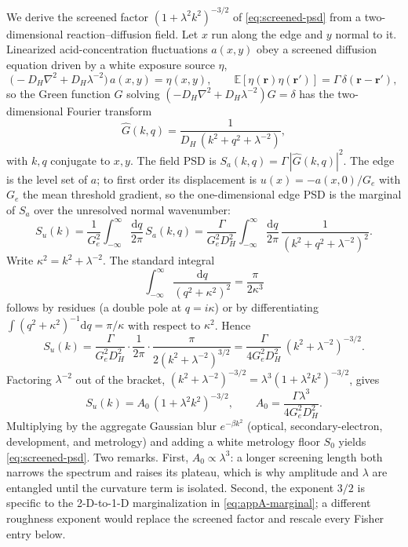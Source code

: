 \documentclass[11pt]{article}
\newcommand{\E}{\mathbb{E}}
\newcommand{\dd}{\mathrm{d}}
\begin{document}
We derive the screened factor \((1+\lambda^2k^2)^{-3/2}\) of \eqref{eq:screened-psd} from a two-dimensional reaction--diffusion field. Let \(x\) run along the edge and \(y\) normal to it. Linearized acid-concentration fluctuations \(a(x,y)\) obey a screened diffusion equation driven by a white exposure source \(\eta\),
\begin{equation}
\big(-D_H\nabla^2+D_H\lambda^{-2}\big)\,a(x,y)=\eta(x,y),
\qquad \E[\eta(\mathbf r)\eta(\mathbf r')]=\Gamma\,\delta(\mathbf r-\mathbf r'),
\label{eq:appA-pde}
\end{equation}
so the Green function \(G\) solving \((-D_H\nabla^2+D_H\lambda^{-2})G=\delta\) has the two-dimensional Fourier transform
\begin{equation}
\widehat G(k,q)=\frac{1}{D_H\,(k^2+q^2+\lambda^{-2})},
\label{eq:appA-green}
\end{equation}
with \(k,q\) conjugate to \(x,y\). The field PSD is \(S_a(k,q)=\Gamma\,|\widehat G(k,q)|^2\). The edge is the level set of \(a\); to first order its displacement is \(u(x)=-a(x,0)/G_e\) with \(G_e\) the mean threshold gradient, so the one-dimensional edge PSD is the marginal of \(S_a\) over the unresolved normal wavenumber:
\begin{equation}
S_u(k)=\frac{1}{G_e^2}\int_{-\infty}^{\infty}\frac{\dd q}{2\pi}\,S_a(k,q)
=\frac{\Gamma}{G_e^2D_H^2}\int_{-\infty}^{\infty}\frac{\dd q}{2\pi}\,\frac{1}{(k^2+q^2+\lambda^{-2})^2}.
\label{eq:appA-marginal}
\end{equation}
Write \(\kappa^2=k^2+\lambda^{-2}\). The standard integral
\begin{equation}
\int_{-\infty}^{\infty}\frac{\dd q}{(q^2+\kappa^2)^2}=\frac{\pi}{2\kappa^3}
\label{eq:appA-int}
\end{equation}
follows by residues (a double pole at \(q=i\kappa\)) or by differentiating \(\int(q^2+\kappa^2)^{-1}\dd q=\pi/\kappa\) with respect to \(\kappa^2\). Hence
\begin{equation}
S_u(k)=\frac{\Gamma}{G_e^2D_H^2}\cdot\frac{1}{2\pi}\cdot\frac{\pi}{2(k^2+\lambda^{-2})^{3/2}}
=\frac{\Gamma}{4G_e^2D_H^2}\,(k^2+\lambda^{-2})^{-3/2}.
\label{eq:appA-pre}
\end{equation}
Factoring \(\lambda^{-2}\) out of the bracket, \((k^2+\lambda^{-2})^{-3/2}=\lambda^{3}(1+\lambda^2k^2)^{-3/2}\), gives
\begin{equation}
S_u(k)=A_0\,(1+\lambda^2k^2)^{-3/2},\qquad A_0=\frac{\Gamma\lambda^3}{4G_e^2D_H^2}.
\label{eq:appA-final}
\end{equation}
Multiplying by the aggregate Gaussian blur \(e^{-\beta k^2}\) (optical, secondary-electron, development, and metrology) and adding a white metrology floor \(S_0\) yields \eqref{eq:screened-psd}. Two remarks. First, \(A_0\propto\lambda^3\): a longer screening length both narrows the spectrum and raises its plateau, which is why amplitude and \(\lambda\) are entangled until the curvature term is isolated. Second, the exponent \(3/2\) is specific to the 2-D-to-1-D marginalization in \eqref{eq:appA-marginal}; a different roughness exponent would replace the screened factor and rescale every Fisher entry below.
\end{document}
